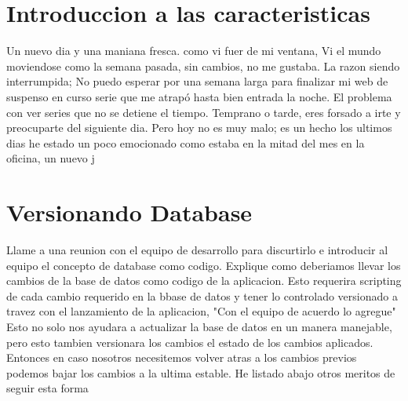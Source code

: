 \section{Introduccion a las caracteristicas}
Un nuevo dia y una maniana fresca. como vi fuer de mi ventana, Vi el mundo moviendose como la semana pasada, sin cambios, no me gustaba. La razon siendo interrumpida; No puedo esperar por una semana larga para finalizar mi web de suspenso en curso serie que me atrapó hasta bien entrada la noche. El problema con ver series que no se detiene el tiempo. Temprano o tarde, eres forsado a irte y preocuparte del siguiente dia. Pero hoy no es muy malo; es un hecho los ultimos dias he estado un poco emocionado como estaba en la mitad del mes en la oficina, un nuevo j
\section{Versionando Database}
Llame a una reunion con el equipo de desarrollo para discurtirlo e introducir al equipo el concepto de database como codigo. Explique como deberiamos llevar los cambios de la base de datos como codigo de la aplicacion. Esto requerira scripting de cada cambio requerido en la bbase de datos y tener lo controlado versionado a travez con el lanzamiento de la aplicacion, "Con el equipo de acuerdo lo agregue" Esto no solo nos ayudara a actualizar la base de datos en un manera manejable, pero esto tambien versionara los cambios el estado de los cambios aplicados. Entonces en caso nosotros necesitemos volver atras a los cambios previos podemos bajar los cambios a la ultima estable.
He listado abajo otros meritos de seguir esta forma
